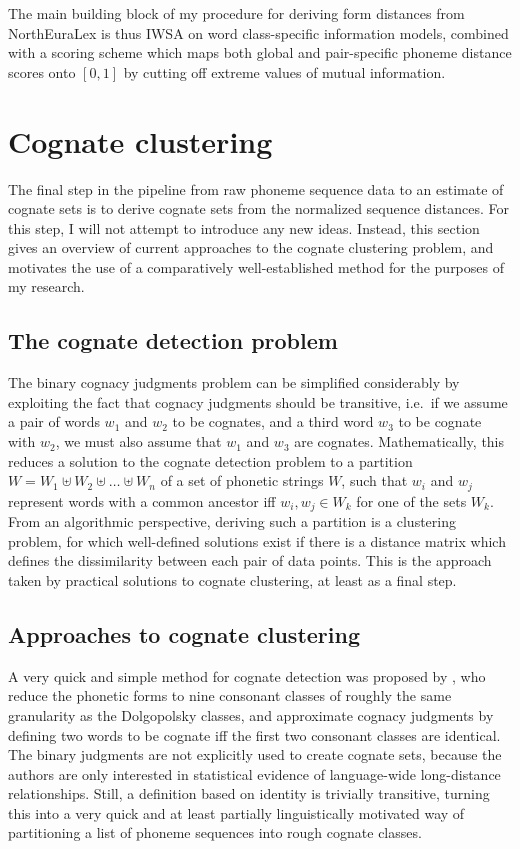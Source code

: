 The main building block of my procedure for deriving form distances from NorthEuraLex is thus IWSA on word class-specific information models, combined with a scoring scheme which maps both global and pair-specific phoneme distance scores onto $[0,1]$ by cutting off extreme values of mutual information.

\section{Cognate clustering}
The final step in the pipeline from raw phoneme sequence data to an estimate of cognate sets is to derive cognate sets from the normalized sequence distances. For this step, I will not attempt to introduce any new ideas. Instead, this section gives an overview of current approaches to the cognate clustering problem, and motivates the use of a comparatively well-established method for the purposes of my research.

\subsection{The cognate detection problem}
The binary cognacy judgments problem can be simplified considerably by exploiting the fact that cognacy judgments should be transitive, i.e.\ if we assume a pair of words $w_1$ and $w_2$ to be cognates, and a third word $w_3$ to be cognate with $w_2$, we must also assume that $w_1$ and $w_3$ are cognates. Mathematically, this reduces a solution to the cognate detection problem to a partition $W = W_1 \uplus W_2 \uplus \dots \uplus W_n$ of a set of phonetic strings $W$, such that $w_i$ and $w_j$ represent words with a common ancestor iff $w_i,w_j \in W_k$ for one of the sets $W_k$. From an algorithmic perspective, deriving such a partition is a clustering problem, for which well-defined solutions exist if there is a distance matrix which defines the dissimilarity between each pair of data points. This is the approach taken by practical solutions to cognate clustering, at least as a final step.

\subsection{Approaches to cognate clustering}
A very quick and simple method for cognate detection was proposed by \cite{turchin_ea_2010}, who reduce the phonetic forms to nine consonant classes of roughly the same granularity as the Dolgopolsky classes, and approximate cognacy judgments by defining two words to be cognate iff the first two consonant classes are identical. The binary judgments are not explicitly used to create cognate sets, because the authors are only interested in statistical evidence of language-wide long-distance relationships. Still, a definition based on identity is trivially transitive, turning this into a very quick and at least partially linguistically motivated way of partitioning a list of phoneme sequences into rough cognate classes.

